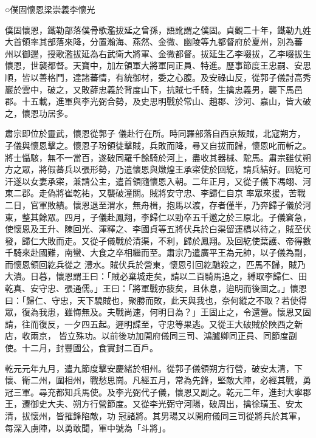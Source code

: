 
\begin{pinyinscope}

 ○僕固懷恩梁崇義李懷光



 僕固懷恩，鐵勒部落僕骨歌濫拔延之曾孫，語訛謂之僕固。貞觀二十年，鐵勒九姓大首領率其部落來降，分置瀚海、燕然、金微、幽陵等九都督府於夏州，別為蕃
 州以御邊，授歌濫拔延為右武衛大將軍、金微都督。拔延生乙李啜拔，乙李啜拔生懷恩，世襲都督。天寶中，加左領軍大將軍同正員、特進。歷事節度王忠嗣、安思順，皆以善格鬥，達諸蕃情，有統御材，委之心腹。及安祿山反，從郭子儀討高秀巖於雲中，破之，又敗薛忠義於背度山下，抗賊七千騎，生擒忠義男，襲下馬邑郡。十五載，進軍與李光弼合勢，及史思明戰於常山、趙郡、沙河、嘉山，皆大破之，懷恩功居多。



 肅宗即位於靈武，懷恩從郭子
 儀赴行在所。時同羅部落自西京叛賊，北寇朔方，子儀與懷恩擊之。懷恩子玢領徒擊賊，兵敗而降，尋又自拔而歸，懷恩叱而斬之。將士懾駭，無不一當百，遂破同羅千餘騎於河上，盡收其器械、駝馬。肅宗雖仗朔方之眾，將假蕃兵以張形勢，乃遣懷恩與燉煌王承寀使於回紇，請兵結好。回紇可汗遂以女妻承寀，兼請公主，遣首領隨懷恩入朝。二年正月，又從子儀下馮翊、河東二郡。走偽將崔乾祐，又襲破潼關。賊將安守忠、李歸仁自京
 率眾來援，苦戰二日，官軍敗績。懷恩退至渭水，無舟楫，抱馬以渡，存者僅半，乃奔歸子儀於河東，整其餘眾。四月，子儀赴鳳翔，李歸仁以勁卒五千邀之於三原北。子儀窘急，使懷恩及王升、陳回光、渾釋之、李國貞等五將伏兵於白渠留運橋以待之，賊至伏發，歸仁大敗而走。又從子儀戰於清渠，不利，歸於鳳翔。及回紇使葉護、帝得數千騎來赴國難，南蠻、大食之卒相繼而至。肅宗乃遣廣平王為元帥，以子儀為副，而懷恩領回紇兵從之
 澧水。賊伏兵於營東，懷恩引回紇馳殺之，匹馬不歸，賊乃大潰。日暮，懷恩謂王曰：「賊必棄城走矣，請以二百騎馬追之，縛取李歸仁、田乾真、安守忠、張通儒。」王曰：「將軍戰亦疲矣，且休息，迨明而後圖之。」懷恩曰：「歸仁、守忠，天下驍賊也，聚勝而敗，此天與我也，奈何縱之不取？若使得眾，復為我患，雖悔無及。夫戰尚速，何明日為？」王固止之，令還營。懷恩又固請，往而復反，一夕四五起。遲明諜至，守忠等果逃。又從王大破賊於陜西之新店，收兩京，
 皆立殊功。以前後功加開府儀同三司、鴻臚卿同正員、同節度副使。十二月，封豐國公，食實封二百戶。



 乾元元年九月，遣九節度擊安慶緒於相州。從郭子儀領朔方行營，破安太清，下懷、衛二州，圍相州，戰愁思崗。凡經五月，常為先鋒，堅敵大陣，必經其戰，勇冠三軍。尋充都知兵馬使。及李光弼代子儀，懷恩又副之。乾元二年，進封大寧郡王，遷御史大夫、朔方行營節度。又從李光弼守河陽，破周出，擒徐璜玉、安太清，拔懷州，皆摧鋒陷敵，功
 冠諸將。其男瑒又以開府儀同三司從將兵於其軍，每深入虜陣，以勇敢聞，軍中號為「斗將」。




\end{pinyinscope}
